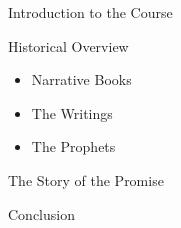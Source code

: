 \begin{frame}{Introduction to the Course}

\end{frame}

\begin{frame}{Historical Overview}

\begin{itemize}
\tightlist
\item
  Narrative Books
\item
  The Writings
\item
  The Prophets
\end{itemize}

\end{frame}

\begin{frame}{The Story of the Promise}

\end{frame}

\begin{frame}{Conclusion}

\end{frame}
